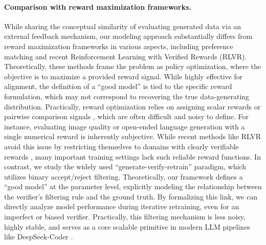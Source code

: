 \paragraph{Comparison with reward maximization frameworks.}
\label{app:reward_comparison}
While sharing the conceptual similarity of evaluating generated data via an external feedback mechanism, our modeling approach substantially differs from reward maximization frameworks in various aspects, including preference matching \citep{ferbach2024self,weiself} and recent Reinforcement Learning with Verified Rewards (RLVR)\citep{guo2024deepseek,yu2025dapo}. 
Theoretically, these methods frame the problem as policy optimization, where the objective is to maximize a provided reward signal. While highly effective for alignment, the definition of a ``good model'' is tied to the specific reward formulation, which may not correspond to recovering the true data-generating distribution.
Practically, reward optimization relies on assigning scalar rewards or pairwise comparison signals \citep{ouyang2022training}, which are often difficult and noisy to define. For instance, evaluating image quality or open-ended language generation with a single numerical reward is inherently subjective. While recent methods like RLVR avoid this issue by restricting themselves to domains with clearly verifiable rewards \citep{guo2025deepseek,wu2025invisible,yu2025dapo}, many important training settings lack such reliable reward functions.
In contrast, we study the widely used ``generate-verify-retrain'' paradigm, which utilizes binary accept/reject filtering. 
Theoretically, our framework defines a ``good model'' at the parameter level, explicitly modeling the relationship between the verifier's filtering rule and the ground truth. 
By formalizing this link, we can directly analyze model performance during iterative retraining, even for an imperfect or biased verifier.
Practically, this filtering mechanism is less noisy, highly stable, and serves as a core scalable primitive in modern LLM pipelines like DeepSeek-Coder \citep{guo2025deepseek}. 


